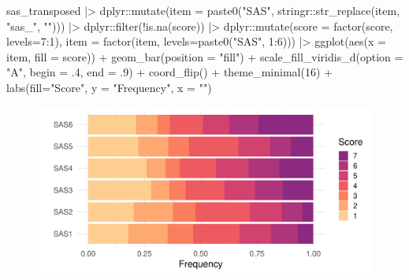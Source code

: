 \documentclass[
  letterpaper,
  DIV=11,
  numbers=noendperiod]{scrreprt}
\newenvironment{Shaded}{\begin{snugshade}}{\end{snugshade}}
\newcommand{\AttributeTok}[1]{\textcolor[rgb]{0.40,0.45,0.13}{#1}}
\newcommand{\DecValTok}[1]{\textcolor[rgb]{0.68,0.00,0.00}{#1}}
\newcommand{\FunctionTok}[1]{\textcolor[rgb]{0.28,0.35,0.67}{#1}}
\newcommand{\NormalTok}[1]{\textcolor[rgb]{0.00,0.23,0.31}{#1}}
\newcommand{\SpecialCharTok}[1]{\textcolor[rgb]{0.37,0.37,0.37}{#1}}
\newcommand{\StringTok}[1]{\textcolor[rgb]{0.13,0.47,0.30}{#1}}
\begin{document}
\begin{Shaded}
\begin{Highlighting}[]
\NormalTok{sas\_transposed }\SpecialCharTok{|\textgreater{}} 
\NormalTok{  dplyr}\SpecialCharTok{::}\FunctionTok{mutate}\NormalTok{(}\AttributeTok{item =} \FunctionTok{paste0}\NormalTok{(}\StringTok{"SAS"}\NormalTok{, stringr}\SpecialCharTok{::}\FunctionTok{str\_replace}\NormalTok{(item, }\StringTok{"sas\_"}\NormalTok{, }\StringTok{""}\NormalTok{))) }\SpecialCharTok{|\textgreater{}} 
\NormalTok{  dplyr}\SpecialCharTok{::}\FunctionTok{filter}\NormalTok{(}\SpecialCharTok{!}\FunctionTok{is.na}\NormalTok{(score)) }\SpecialCharTok{|\textgreater{}} 
\NormalTok{  dplyr}\SpecialCharTok{::}\FunctionTok{mutate}\NormalTok{(}\AttributeTok{score =} \FunctionTok{factor}\NormalTok{(score, }\AttributeTok{levels=}\DecValTok{7}\SpecialCharTok{:}\DecValTok{1}\NormalTok{),}
                \AttributeTok{item =} \FunctionTok{factor}\NormalTok{(item, }\AttributeTok{levels=}\FunctionTok{paste0}\NormalTok{(}\StringTok{"SAS"}\NormalTok{, }\DecValTok{1}\SpecialCharTok{:}\DecValTok{6}\NormalTok{))) }\SpecialCharTok{|\textgreater{}} 
  \FunctionTok{ggplot}\NormalTok{(}\FunctionTok{aes}\NormalTok{(}\AttributeTok{x =}\NormalTok{ item, }\AttributeTok{fill =}\NormalTok{ score)) }\SpecialCharTok{+}
  \FunctionTok{geom\_bar}\NormalTok{(}\AttributeTok{position =} \StringTok{"fill"}\NormalTok{) }\SpecialCharTok{+}
  \FunctionTok{scale\_fill\_viridis\_d}\NormalTok{(}\AttributeTok{option =} \StringTok{"A"}\NormalTok{, }\AttributeTok{begin =}\NormalTok{ .}\DecValTok{4}\NormalTok{, }\AttributeTok{end =}\NormalTok{ .}\DecValTok{9}\NormalTok{) }\SpecialCharTok{+}
  \FunctionTok{coord\_flip}\NormalTok{() }\SpecialCharTok{+}
  \FunctionTok{theme\_minimal}\NormalTok{(}\DecValTok{16}\NormalTok{) }\SpecialCharTok{+}
  \FunctionTok{labs}\NormalTok{(}\AttributeTok{fill=}\StringTok{"Score"}\NormalTok{, }\AttributeTok{y =} \StringTok{"Frequency"}\NormalTok{, }\AttributeTok{x =} \StringTok{""}\NormalTok{)}
\end{Highlighting}
\end{Shaded}

\begin{figure}[H]

{\centering \includegraphics{02_data-screening_files/figure-pdf/item-summary-plot-1.pdf}

}

\end{figure}
\end{document}

